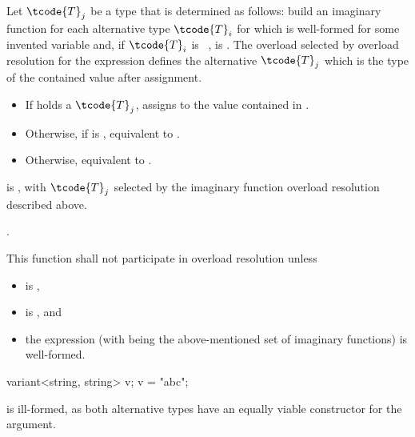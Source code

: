 \begin{itemdescr}
\pnum
Let $\tcode{T}_j$ be a type that is determined as follows:
build an imaginary function 
for each alternative type $\tcode{T}_i$
for which  
is well-formed for some invented variable  and,
if $\tcode{T}_i$ is \cv~,  is .
The overload  selected by overload
resolution for the expression  defines
the alternative $\tcode{T}_j$ which is the type of the contained value after
assignment.

\pnum
\effects
\begin{itemize}
\item
If  holds a $\tcode{T}_j$, assigns  to
the value contained in .
\item
Otherwise, if 
 is ,
equivalent to .
\item
Otherwise, equivalent to .
\end{itemize}

\pnum
\ensures
{} is , with $\tcode{T}_j$
selected by the imaginary function overload resolution described above.

\pnum
\returns {}.

\pnum
\remarks
This function shall not participate in overload resolution unless
\begin{itemize}
\item
   is ,

\item
  is , and

\item
  the expression 
  (with  being the above-mentioned set
  of imaginary functions) is well-formed.
\end{itemize}

\pnum
\begin{note}
\begin{codeblock}
variant<string, string> v;
v = "abc";
\end{codeblock}
is ill-formed, as both alternative types have an equally viable constructor
for the argument. \end{note}


\end{itemdescr}
